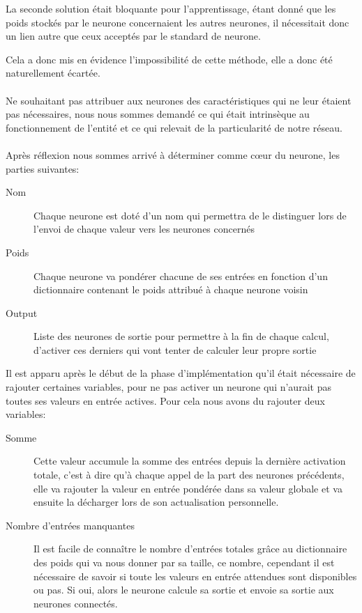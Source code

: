 La seconde solution était bloquante pour l'apprentissage, étant donné que les
poids stockés par le neurone concernaient les autres neurones, il nécessitait
donc un lien autre que ceux acceptés par le standard de neurone.

Cela a donc mis en évidence l'impossibilité de cette méthode, elle a donc été
naturellement écartée.

\paragraph{}


\paragraph{}
Ne souhaitant pas attribuer aux neurones des caractéristiques qui ne leur étaient
pas nécessaires, nous nous sommes demandé ce qui était intrinsèque au
fonctionnement de l'entité et ce qui relevait de la particularité de notre
réseau.

\paragraph{}
Après réflexion nous sommes arrivé à déterminer comme cœur du neurone, les
parties suivantes:\\

\begin{description}
  \item[Nom] Chaque neurone est doté d'un nom qui permettra de le distinguer
    lors de l'envoi de chaque valeur vers les neurones concernés
  \item[Poids] Chaque neurone va pondérer chacune de ses entrées en fonction
    d'un dictionnaire contenant le poids attribué à chaque neurone voisin
  \item[Output] Liste des neurones de sortie pour permettre à la fin de chaque
    calcul, d'activer ces derniers qui vont tenter de calculer leur propre
    sortie
\end{description}

Il est apparu après le début de la phase d'implémentation qu'il était nécessaire
de rajouter certaines variables, pour ne pas activer un neurone qui n'aurait pas
toutes ses valeurs en entrée actives.
Pour cela nous avons du rajouter deux variables:\\

\begin{description}
  \item[Somme] Cette valeur accumule la somme des entrées depuis la dernière
    activation totale, c'est à dire qu'à chaque appel de la part des neurones
    précédents, elle va rajouter la valeur en entrée pondérée dans sa valeur
    globale et va ensuite la décharger lors de son actualisation personnelle. 
  \item[Nombre d'entrées manquantes] Il est facile de connaître le nombre
    d'entrées
    totales grâce au dictionnaire des poids qui va nous donner par sa taille, ce
    nombre, cependant il est nécessaire de savoir si toute les valeurs en entrée
    attendues sont disponibles ou pas. Si oui, alors le neurone calcule sa
    sortie et envoie sa sortie aux neurones connectés.
  \end{description}
